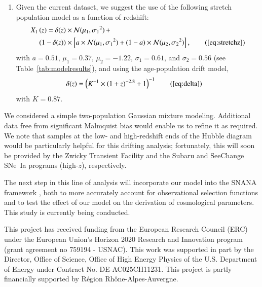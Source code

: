 \documentclass[]{aa}
\begin{document}
\begin{enumerate}
    \item Given the current dataset, we suggest the use of the following stretch
        population model as a function of redshift:
        \begin{align*}
        \label{eqconclusion:stretchz}
            X_1\left(z \right) =
            \delta(z)&\times\mathcal{N}(\mu_1,\sigma_1{}^2)\,+\nonumber\\
            (1-\delta(z))&\times \left[a\times\mathcal{N}(\mu_1,\sigma_1{}^2) +
            (1-a)\times\mathcal{N}(\mu_2,\sigma_2{}^2)\right],
            \tag{\ref{eq:stretchz}}
        \end{align*}
        with $a=0.51$, $\mu_1=0.37$, $\mu_2=-1.22$, $\sigma_1=0.61$, and
        $\sigma_2=0.56$ (see Table~\ref{tab:modelresults}), and using the
        age-population drift model, \begin{align*}
            \delta(z) & = \left( K^{-1} \times (1+z)^{-2.8} +1 \right)^{-1}
            \tag{\ref{eq:delta}}
        \end{align*}
        with $K=0.87$.
\end{enumerate}

We considered a simple two-population Gaussian mixture
modeling. Additional data free from significant Malmquist bias would enable
us to refine it as required. We note that samples at the low- and high-redshift
ends of the Hubble diagram would be particularly helpful for this drifting
analysis; fortunately, this will soon be provided by the Zwicky Transient
Facility \citep[low-$z$,][]{bellm2019, graham2019} and the Subaru and SeeChange
SNe~Ia programs (high-$z$), respectively. 

The next step in this line of analysis will incorporate our model into
the SNANA framework \citep{SNANA}, both to more accurately account for
observational selection functions and to test the effect of our model on the
derivation of cosmological parameters. This study is currently being conducted.

\begin{acknowledgements}
    This project has received funding from the European Research Council (ERC)
    under the European Union's Horizon 2020 Research and Innovation program
    (grant agreement no 759194 - USNAC).
    This work was supported in part by the Director, Office of Science, Office
    of High Energy Physics of the U.S. Department of Energy under Contract No.
    DE-AC025CH11231.
    This project is partly financially supported by Région Rhône-Alpes-Auvergne.
\end{acknowledgements}
\end{document}
